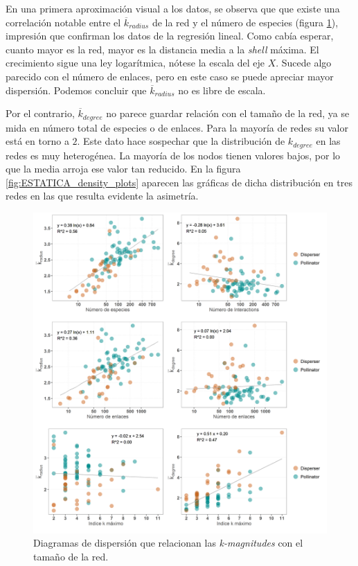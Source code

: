 En una primera aproximación visual a los datos, se observa que que existe una correlación notable entre el $\overline{k}_{radius}$ de la red y el número de especies (figura \ref{fig:ESTATICA_tamanyo_kdegree_kradius}), impresión que confirman los datos de la regresión lineal. Como cabía esperar, cuanto mayor es la red, mayor es la distancia media a la \textit{shell} máxima. El crecimiento sigue una ley logarítmica, nótese la escala del eje $X$. Sucede algo parecido con el número de enlaces, pero en este caso se puede apreciar mayor dispersión. Podemos concluir que $\overline{k}_{radius}$ no es libre de escala.

Por el contrario, $\overline{k}_{degree}$ no parece guardar relación con el tamaño de la red, ya se mida en número total de especies o de enlaces. Para la mayoría de redes su valor está en torno a $2$. Este dato hace sospechar que la distribución de ${k}_{degree}$ en las redes es muy heterogénea. La mayoría de los nodos tienen valores bajos, por lo que la media arroja ese valor tan reducido. En la figura \ref{fig:ESTATICA_density_plots} aparecen las gráficas de dicha distribución en tres redes en las que resulta evidente la asimetría. 

\begin{figure}[h!]
\centering
\includegraphics[scale=0.55]{Figures/ESTATICA_tamanyo_kdegree_kradius.png}
\caption{Diagramas de dispersión que relacionan las \textit{k-magnitudes} con el tamaño de la red.}
\label{fig:ESTATICA_tamanyo_kdegree_kradius}
\end{figure}

